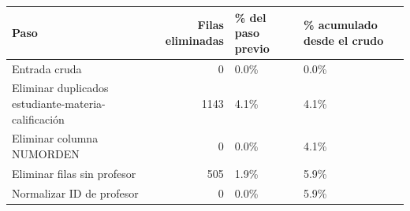 \begin{tabular}{lrll}
\toprule
Paso & Filas eliminadas & \% del paso previo & \% acumulado desde el crudo \\
\midrule
Entrada cruda & 0 & 0.0\% & 0.0\% \\
Eliminar duplicados estudiante-materia-calificación & 1143 & 4.1\% & 4.1\% \\
Eliminar columna NUMORDEN & 0 & 0.0\% & 4.1\% \\
Eliminar filas sin profesor & 505 & 1.9\% & 5.9\% \\
Normalizar ID de profesor & 0 & 0.0\% & 5.9\% \\
\bottomrule
\end{tabular}
